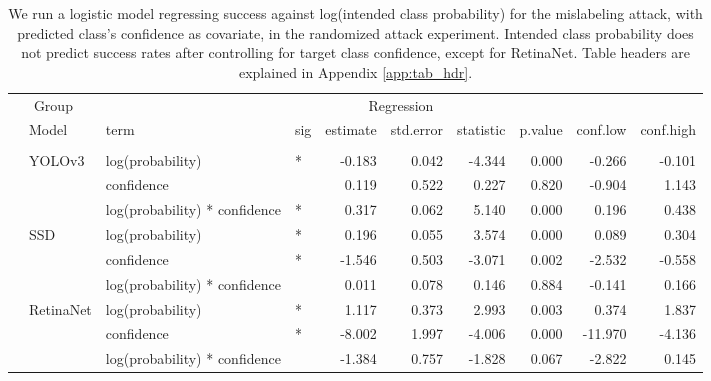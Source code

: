 \documentclass[
]{article}
\begin{document}
\begin{longtable}[t]{llllrrrrrr}
\caption{\label{tab:mislabel_conf_table}We run a logistic model regressing success against log(intended class probability) for the mislabeling attack, with predicted class's confidence as covariate, in the randomized attack experiment. Intended class probability does not predict success rates after controlling for target class confidence, except for RetinaNet. Table headers are explained in Appendix \ref{app:tab_hdr}.}\\
\toprule
\multicolumn{2}{c}{Group} & \multicolumn{8}{c}{Regression} \\
\cmidrule(l{3pt}r{3pt}){1-2} \cmidrule(l{3pt}r{3pt}){3-10}
 & Model & term & sig & estimate & std.error & statistic & p.value & conf.low & conf.high\\
\midrule
\addlinespace[0.3em]
\multicolumn{10}{l}{\textbf{Mislabeling}}\\
\hspace{1em} & YOLOv3 & log(probability) & * & -0.183 & 0.042 & -4.344 & 0.000 & -0.266 & -0.101\\
\cmidrule{3-10}\nopagebreak
\hspace{1em} &  & confidence &  & 0.119 & 0.522 & 0.227 & 0.820 & -0.904 & 1.143\\
\cmidrule{3-10}\nopagebreak
\hspace{1em} &  & log(probability) * confidence & * & 0.317 & 0.062 & 5.140 & 0.000 & 0.196 & 0.438\\
\cmidrule{2-10}\nopagebreak
\hspace{1em} & SSD & log(probability) & * & 0.196 & 0.055 & 3.574 & 0.000 & 0.089 & 0.304\\
\cmidrule{3-10}\nopagebreak
\hspace{1em} &  & confidence & * & -1.546 & 0.503 & -3.071 & 0.002 & -2.532 & -0.558\\
\cmidrule{3-10}\nopagebreak
\hspace{1em} &  & log(probability) * confidence &  & 0.011 & 0.078 & 0.146 & 0.884 & -0.141 & 0.166\\
\cmidrule{2-10}\nopagebreak
\hspace{1em} & RetinaNet & log(probability) & * & 1.117 & 0.373 & 2.993 & 0.003 & 0.374 & 1.837\\
\cmidrule{3-10}\nopagebreak
\hspace{1em} &  & confidence & * & -8.002 & 1.997 & -4.006 & 0.000 & -11.970 & -4.136\\
\cmidrule{3-10}\nopagebreak
\hspace{1em} &  & log(probability) * confidence &  & -1.384 & 0.757 & -1.828 & 0.067 & -2.822 & 0.145\\

\end{longtable}
\end{document}
